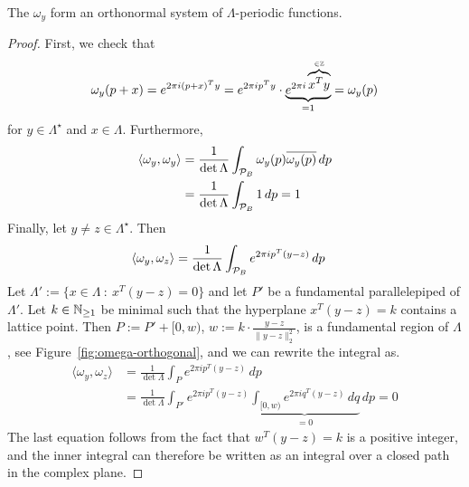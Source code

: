 \begin{lemma}
  \label{lemma:omega-orthonormal}
  The $\omega_y$ form an orthonormal system of $\Lambda$-periodic functions.
\end{lemma}
\begin{proof}
  First, we check that
  \[
    \omega_y(p + x) = e^{2\pi i (p + x)^T y}
      = e^{2\pi i p^Ty} \cdot \underbrace{e^{2\pi i \overbrace{x^Ty}^{\in \mathbb{Z}}}}_{=1} = \omega_y(p)
  \]
  for $y \in \Lambda^\star$ and $x \in \Lambda$.
  Furthermore,
  \begin{align*}
    \langle \omega_y, \omega_y \rangle &= \frac{1}{\det \Lambda} \int_{\mathcal{P}_B} \omega_y(p) \overline{\omega_y(p)} \,dp \\
     &= \frac{1}{\det\Lambda} \int_{\mathcal{P}_B} 1 \,dp = 1
  \end{align*}
  Finally, let $y \neq z \in \Lambda^\star$. Then
  \begin{align*}
    \langle \omega_y, \omega_z \rangle
      &= \frac{1}{\det \Lambda} \int_{\mathcal{P}_B} e^{2\pi i p^T(y - z)} \,dp
  \end{align*}
  Let $\Lambda' := \{ x \in \Lambda ~:~ x^T (y - z) = 0 \}$
  and let $P'$ be a fundamental parallelepiped of $\Lambda'$.
  Let $k \in \mathbb{N}_{\geq 1}$ be minimal such that the hyperplane $x^T (y - z) = k$
  contains a lattice point.
  Then $P := P' + [0,w)$, $w := k \cdot \frac{y - z}{\|y-z\|_2^2}$,
  is a fundamental region of $\Lambda$, see Figure~\ref{fig:omega-orthogonal},
  and we can rewrite the integral as.
  \begin{align*}
    \langle \omega_y, \omega_z \rangle
      &= \frac{1}{\det \Lambda} \int_{P} e^{2\pi i p^T(y - z)} \,dp \\
      &= \frac{1}{\det \Lambda} \int_{P'} e^{2\pi i p^T(y - z)}
        \underbrace{\int_{[0,w)} e^{2\pi i q^T(y-z)} \,dq}_{=0} \,dp = 0
  \end{align*}
  The last equation follows from the fact that $w^T (y - z) = k$ is a positive integer,
  and the inner integral can therefore be written as an integral over a closed path in the complex plane.
\end{proof}

